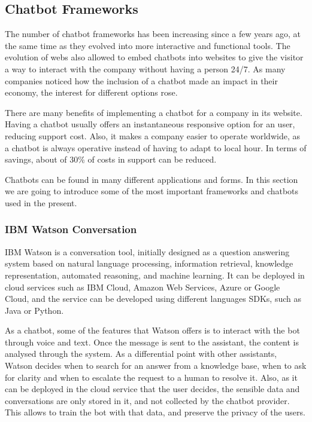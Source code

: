 \subsection{Chatbot Frameworks}
The number of chatbot frameworks has been increasing since a few years ago, at the same time as they evolved into more interactive and functional tools. The evolution of webs also allowed to embed chatbots into websites to give the visitor a way to interact with the company without having a person 24/7. As many companies noticed how the inclusion of a chatbot made an impact in their economy, the interest for different options rose.

There are many benefits of implementing a chatbot for a company in its website. Having a chatbot usually offers an instantaneous responsive option for an user, reducing support cost. Also, it makes a company easier to operate worldwide, as a chatbot is always operative instead of having to adapt to local hour. In terms of savings, about of 30\% of costs in support can be reduced\cite{saving_percent}.

Chatbots can be found in many different applications and forms. In this section we are going to introduce some of the most important frameworks and chatbots used in the present.

\subsubsection{IBM Watson Conversation}
IBM Watson is a conversation tool, initially designed as a question answering system based on natural language processing, information retrieval, knowledge representation, automated reasoning, and machine learning\cite{ibm_watson}. It can be deployed in cloud services such as IBM Cloud, Amazon Web Services, Azure or Google Cloud, and the service can be developed using different languages SDKs, such as Java or Python. 

As a chatbot, some of the features that Watson offers is to interact with the bot through voice and text. Once the message is sent to the assistant, the content is analysed through the system. As a differential point with other assistants, Watson decides when to search for an answer from a knowledge base, when to ask for clarity and when to escalate the request to a human to resolve it. Also, as it can be deployed in the cloud service that the user decides, the sensible data and conversations are only stored in it, and not collected by the chatbot provider. This allows to train the bot with that data, and preserve the privacy of the users.


